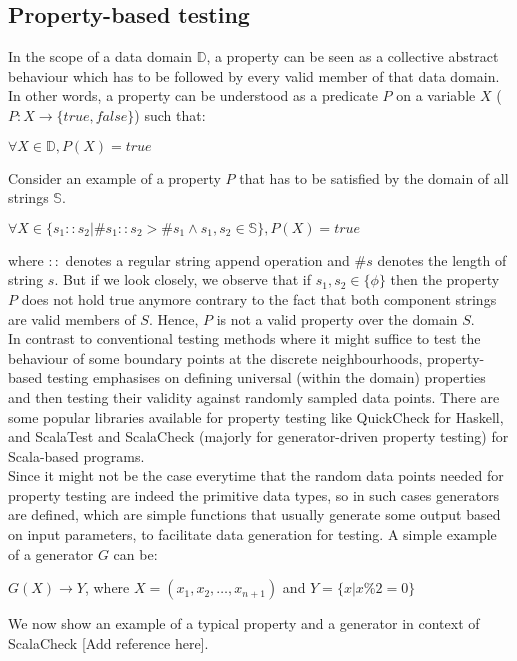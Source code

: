 
\newcommand{\avector}[2]{(#1_1,#1_2,\ldots,#1_{#2})}
\newcommand{\aDEFvector}[2][a]{(#1_1,#1_2,\ldots,#1_{#2})}

\subsection{Property-based testing}
In the scope of a data domain $\mathbb{D}$, a property can be seen as a collective abstract behaviour which has to be followed by every valid member of that data domain. In other words, a property can be understood as a predicate $P$ on a variable $X$ ($P:X \rightarrow \{true, false\}$) such that: 
\begin{center}
$\forall X \in \mathbb{D}, P(X) = true$
\end{center}
Consider an example of a property $P$ that has to be satisfied by the domain of all strings $\mathbb{S}$.
\begin{center}
$\forall X \in \{s_1::s_2 | \#s_1::s_2 >  \#s_1 \wedge s_1, s_2 \in \mathbb{S}\}, P(X) = true$
\end{center}
where $::$ denotes a regular string append operation and $\#s$ denotes the length of string $s$. But if we look closely, we observe that if $s_1, s_2 \in \{\phi\}$ then the property $P$ does not hold true anymore contrary to the fact that both component strings are valid members of $S$. Hence, $P$ is not a valid property over the domain $S$. \\
In contrast to conventional testing methods where it might suffice to test the behaviour of some boundary points at the discrete neighbourhoods, property-based testing emphasises on defining universal (within the domain) properties and then testing their validity against randomly sampled data points. There are some popular libraries available for property testing like QuickCheck for Haskell,  and ScalaTest and ScalaCheck (majorly for generator-driven property testing) for Scala-based programs. \\
Since it might not be the case everytime that the random data points needed for property testing are indeed the primitive data types, so in such cases generators are defined, which are simple functions that usually generate some output based on input parameters, to facilitate data generation for testing. A simple example of a generator $G$ can be:
\begin{center}
$G(X) \rightarrow {Y}$, where $X=\aDEFvector[x]{n+1}$ and $Y=\{x | x \% 2 = 0\}$
\end{center}
We now show an example of a typical property and a generator in context of ScalaCheck [Add reference here]. 
